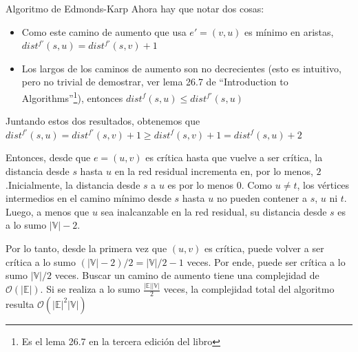 \documentclass[8pt,xcolor={dvipsnames}]{beamer}
\begin{document}
\begin{frame}{Algoritmo de Edmonds-Karp}
    \small
	Ahora hay que notar dos cosas:
	\begin{itemize}
		\item Como este camino de aumento que usa $e' = (v,u)$ es m\'inimo en aristas, $dist^{f'}(s,u) = dist^{f'}(s,v) + 1$
		\item Los largos de los caminos de aumento son no decrecientes (esto es intuitivo, pero no trivial de demostrar, ver lema 26.7 de ``Introduction to Algorithms''\footnote{Es el lema 26.7 en la tercera edici\'on del libro}), entonces $dist^{f}(s,u) \leq dist^{f'}(s,u)$
	\end{itemize}
	
	\pause
	Juntando estos dos resultados, obtenemos que $dist^{f'}(s,u) = dist^{f'}(s,v) + 1 \geq dist^{f}(s,v) + 1 = dist^{f}(s,u) + 2$ 
	
	Entonces, desde que $e=(u,v)$ es crítica hasta que vuelve a ser crítica, la distancia desde $s$ hasta $u$ en la red residual incrementa en, por lo menos, $2$.\pause Inicialmente, la distancia desde $s$ a $u$ es por lo menos $0$. Como $u\neq t$, los vértices intermedios en el camino mínimo desde $s$ hasta $u$ no pueden contener a $s$, $u$ ni $t$. Luego, a menos que $u$ sea inalcanzable en la red residual, su distancia desde $s$ es a lo sumo $|\mathbb{V}| - 2$. 
	\pause
	
	Por lo tanto, desde la primera vez que $(u,v)$ es crítica, puede volver a ser crítica a lo sumo $(|\mathbb{V}| - 2)/2 = |\mathbb{V}|/2 - 1$ veces. Por ende, puede ser crítica a lo sumo $|\mathbb{V}|/2$ veces.
	\pause
	Buscar un camino de aumento tiene una complejidad de $\mathcal{O}(|\mathbb{E}|)$. Si se realiza a lo sumo $\frac{|\mathbb{E}||\mathbb{V}|}{2}$ veces, la complejidad total del algoritmo resulta $\mathcal{O}(|\mathbb{E}|^2|\mathbb{V}|)$ 
	
	\medskip
\end{frame}
\end{document}
